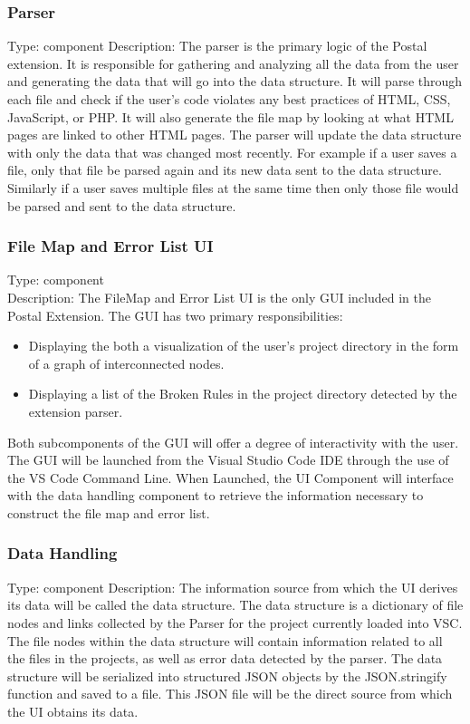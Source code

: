 \documentclass[letterpaper,10pt,titlepage,draftclsnofoot,onecolumn,onesided] {IEEEtran}
\begin{document}
	\subsubsection{Parser}
	Type: component
	Description: 
	The parser is the primary logic of the Postal extension. 
	It is responsible for gathering and analyzing all the data from the user and generating the data that will go into the data structure.
	It will parse through each file and check if the user's code violates any best practices of HTML, CSS, JavaScript, or PHP. 
	It will also generate the file map by looking at what HTML pages are linked to other HTML pages.
	The parser will update the data structure with only the data that was changed most recently.
	For example if a user saves a file, only that file be parsed again and its new data sent to the data structure.
	Similarly if a user saves multiple files at the same time then only those file would be parsed and sent to the data structure.
	
		
	
	\subsubsection{File Map and Error List UI}
	Type: component
	\\
	Description: The FileMap and Error List UI is the only GUI included in the Postal Extension. 
	The GUI has two primary responsibilities: 
	\begin{itemize}
	\item Displaying the both a visualization of the user's project directory in the form of a graph of interconnected nodes.
	\item Displaying a list of the Broken Rules in the project directory detected by the extension parser.
	\end{itemize}
	Both subcomponents of the GUI will offer a degree of interactivity with the user. 
	The GUI will be launched from the Visual Studio Code IDE through the use of the VS Code Command Line.
	When Launched, the UI Component will interface with the data handling component to retrieve the information necessary to construct the file map and error list.

	
	\subsubsection{Data Handling} 
	Type: component
	Description: The information source from which the UI derives its data will be called the data structure. 
	The data structure is a dictionary of file nodes and links collected by the Parser for the project currently loaded into VSC. 
	The file nodes within the data structure will contain information related to all the files in the projects, as well as error data detected by the parser.
	The data structure will be serialized into structured JSON objects by the JSON.stringify function and saved to a file. \cite{stringify}
	This JSON file will be the direct source from which the UI obtains its data.
\end{document}
